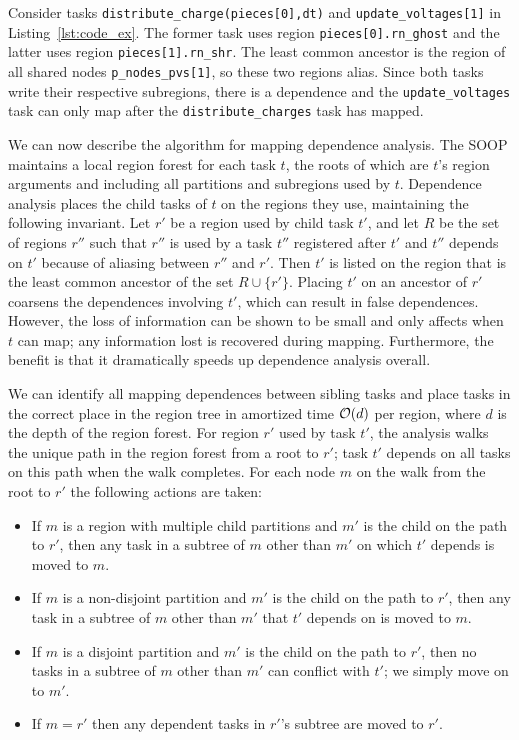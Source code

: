 Consider tasks {\tt distribute\_charge(pieces[0],dt)} and
{\tt update\_voltages[1]} in Listing~\ref{lst:code_ex}.  The former task
uses region {\tt pieces[0].rn\_ghost} and the latter uses region {\tt pieces[1].rn\_shr}.
The least common ancestor is the region of all shared nodes {\tt p\_nodes\_pvs[1]},
so these two regions alias.  Since both tasks write their respective subregions,
there is a dependence and the {\tt update\_voltages} task can only map after the
{\tt distribute\_charges} task has mapped.

We can now describe the algorithm for mapping dependence analysis.
The SOOP maintains a local region forest for each task $t$,
the roots of which are $t$'s region arguments and including all
partitions and subregions used by $t$.  Dependence analysis
places the child tasks of $t$ on the regions they use, maintaining the
following invariant. Let $r'$ be a region used by child task $t'$,
and let $R$ be the set of regions $r''$ such that $r''$ is used
by a task $t''$ registered after $t'$ and $t''$ depends on $t'$
because of aliasing between $r''$ and $r'$.  Then $t'$ is listed on the
region that is the least common ancestor of the set $R \cup \{r'\}$.
Placing $t'$ on an ancestor of $r'$ coarsens the
dependences involving $t'$, which
can result in false dependences.  However, the loss of
information can be shown to be small and only affects when $t$ can
map; any information lost is recovered during mapping.
Furthermore, the benefit is that it dramatically speeds up
dependence analysis overall.

We can identify all mapping dependences between sibling tasks and place tasks
in the correct place in the region tree in amortized time ${\cal O}(d)$ per region,
where $d$ is the depth of the region forest.  For region $r'$ used by task $t'$, the analysis
walks the unique path in the region forest from a root to $r'$; task $t'$ depends on all tasks
on this path when the walk completes.  For each node $m$
on the walk from the root to $r'$ the following actions are taken:
\begin{itemize}
\item If $m$ is a region with multiple child partitions and $m'$ is the child on the
path to $r'$, then any task in a subtree of $m$ other than $m'$ on which $t'$ depends 
is moved to $m$.

\item If $m$ is a non-disjoint partition and $m'$ is the child on the
path to $r'$, then any task in a subtree of $m$ other than $m'$ that $t'$ depends on is
moved to $m$.

\item If $m$ is a disjoint partition and $m'$ is the child on the
path to $r'$, then no tasks in a subtree of $m$ other than $m'$ can conflict with $t'$; we simply move
on to $m'$.

\item If $m = r'$ then any dependent tasks in $r'$'s subtree are moved to $r'$.
\end{itemize}

